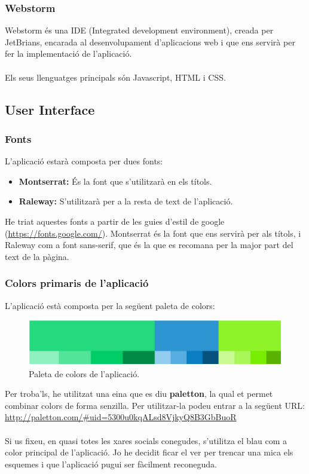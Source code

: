 \documentclass[11pt,catalan,listoffigures,listoftables]{tfgetsinf}
\begin{document}
\subsubsection{Webstorm}

Webstorm és una IDE (Integrated development environment), creada per JetBrians, encarada al desenvolupament d'aplicacions web i que ens servirà per fer la implementació de l'aplicació.\\ \\
Els seus llenguatges principals són Javascript, HTML i CSS.

\subsection{User Interface}

\subsubsection{Fonts}

L'aplicació estarà composta per dues fonts:
\begin{itemize}
\item \textbf{Montserrat:} És la font que s'utilitzarà en els títols.
\item \textbf{Raleway:} S'utilitzarà per a la resta de text de l'aplicació.
\end{itemize}
He triat aquestes fonts a partir de les guies d'estil de google (\url{https://fonts.google.com/}). Montserrat és la font que ens servirà per als títols, i Raleway com a font sans-serif, que és la que es recomana per la major part del text de la pàgina.
\newpage
\subsubsection{Colors primaris de l'aplicació}

L'aplicació està composta per la següent paleta de colors:

\begin{figure}[h]
\includegraphics[width=12cm]{images/image1}
\centering
\caption[Figura 4.2]{Paleta de colors de l'aplicació.}
\centering
\end{figure}
Per troba'ls, he utilitzat una eina que es diu \textbf{paletton}, la qual et permet combinar colors de forma senzilla. Per utilitzar-la podeu entrar a la següent URL:\\
\url{http://paletton.com/\#uid=5300u0kqALsd8VjkyQ8B3GbBuoR} \\ \\
Si us fixeu, en quasi totes les xares socials conegudes, s'utilitza el blau com a color principal de l'aplicació. Jo he decidit ficar el ver per trencar una mica els esquemes i que l'aplicació pugui ser fàcilment reconeguda.
\end{document}
